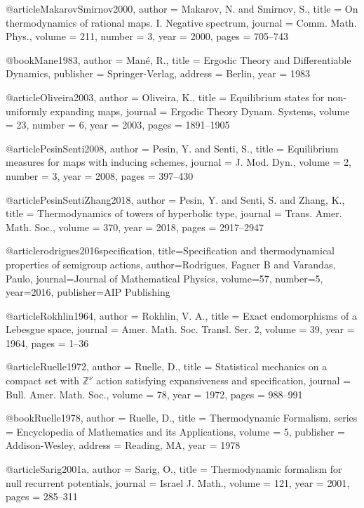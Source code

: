 @article{MakarovSmirnov2000,
  author = {Makarov, N. and Smirnov, S.},
  title = {On thermodynamics of rational maps. I. Negative spectrum},
  journal = {Comm. Math. Phys.},
  volume = {211},
  number = {3},
  year = {2000},
  pages = {705--743}
}

@book{Mane1983,
  author = {Mané, R.},
  title = {Ergodic Theory and Differentiable Dynamics},
  publisher = {Springer-Verlag},
  address = {Berlin},
  year = {1983}
}

@article{Oliveira2003,
  author = {Oliveira, K.},
  title = {Equilibrium states for non-uniformly expanding maps},
  journal = {Ergodic Theory Dynam. Systems},
  volume = {23},
  number = {6},
  year = {2003},
  pages = {1891--1905}
}

@article{PesinSenti2008,
  author = {Pesin, Y. and Senti, S.},
  title = {Equilibrium measures for maps with inducing schemes},
  journal = {J. Mod. Dyn.},
  volume = {2},
  number = {3},
  year = {2008},
  pages = {397--430}
}

@article{PesinSentiZhang2018,
  author = {Pesin, Y. and Senti, S. and Zhang, K.},
  title = {Thermodynamics of towers of hyperbolic type},
  journal = {Trans. Amer. Math. Soc.},
  volume = {370},
  year = {2018},
  pages = {2917--2947}
}

@article{rodrigues2016specification,
  title={Specification and thermodynamical properties of semigroup actions},
  author={Rodrigues, Fagner B and Varandas, Paulo},
  journal={Journal of Mathematical Physics},
  volume={57},
  number={5},
  year={2016},
  publisher={AIP Publishing}
}

@article{Rokhlin1964,
  author = {Rokhlin, V. A.},
  title = {Exact endomorphisms of a Lebesgue space},
  journal = {Amer. Math. Soc. Transl. Ser. 2},
  volume = {39},
  year = {1964},
  pages = {1--36}
}

@article{Ruelle1972,
  author = {Ruelle, D.},
  title = {Statistical mechanics on a compact set with $\mathbb{Z}^\nu$ action satisfying expansiveness and specification},
  journal = {Bull. Amer. Math. Soc.},
  volume = {78},
  year = {1972},
  pages = {988--991}
}

@book{Ruelle1978,
  author = {Ruelle, D.},
  title = {Thermodynamic Formalism},
  series = {Encyclopedia of Mathematics and its Applications},
  volume = {5},
  publisher = {Addison-Wesley},
  address = {Reading, MA},
  year = {1978}
}



@article{Sarig2001a,
  author = {Sarig, O.},
  title = {Thermodynamic formalism for null recurrent potentials},
  journal = {Israel J. Math.},
  volume = {121},
  year = {2001},
  pages = {285--311}
}

